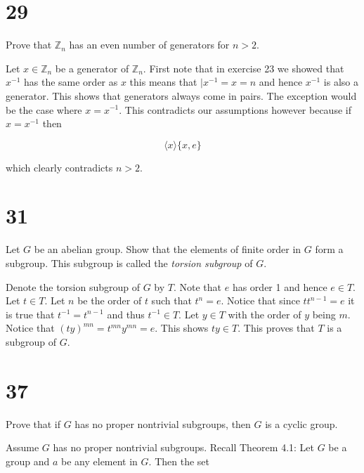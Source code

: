 \documentclass[a4paper]{article}
\begin{document}
\section*{29}

Prove that $\mathbb{Z}_n$ has an even number of generators for $n > 2$.

\vspace{\baselineskip}

Let $x \in \mathbb{Z}_n$ be a generator of $\mathbb{Z}_n$. First note that in exercise 23 we showed that $x^{-1}$ has the same order as $x$ this means that $|x^{-1} = x = n$ and hence $x^{-1}$ is also a generator. This shows that generators always come in pairs. The exception would be the case where $x = x^{-1}$. This contradicts our assumptions however because if $x = x^{-1}$ then

$$\langle x \rangle \{x, e \}$$

which clearly contradicts $n > 2$.



\section*{31}


Let $G$ be an abelian group. Show that the elements of finite order in $G$ form a subgroup. This subgroup is called the \textit{torsion subgroup} of $G$.

\vspace{\baselineskip}

Denote the torsion subgroup of $G$ by $T$. Note that $e$ has order 1 and hence $e \in T$. Let $t \in T$. Let $n$ be the order of $t$ such that $t^n = e$. Notice that since $tt^{n-1} = e$ it is true that $t^{-1} = t^{n-1}$ and thus $t^{-1} \in T$. Let $y \in T$ with the order of $y$ being $m$. Notice that $(ty)^{mn} = t^{mn}y^{mn} = e$. This shows $ty \in T$. This proves that $T$ is a subgroup of $G$. 


\section*{37}

Prove that if $G$ has no proper nontrivial subgroups, then $G$ is a cyclic group.

\vspace{\baselineskip}

Assume $G$ has no proper nontrivial subgroups. Recall Theorem 4.1: Let $G$ be a group and $a$ be any element in $G$. Then the set
\end{document}
